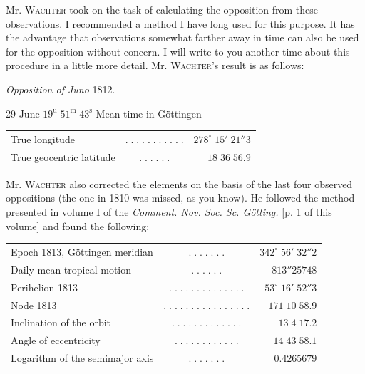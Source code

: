 \par\indent Mr. \textsc{Wachter} took on the task of calculating the opposition from these observations. I recommended a method I have long used for this purpose. It has the advantage that observations somewhat farther away in time can also be used for the opposition without concern. I will write to you another time about this procedure in a little more detail. Mr. \textsc{Wachter}’s result is as follows:

\begin{center}
\emph{Opposition of Juno} 1812.
\end{center}

29 June $19^{\mathrm u}\;51^{\mathrm m}\;43^{\mathrm s}$ Mean time in Göttingen

\begin{center}\fontsize{10}{12}\selectfont\setlength{\tabcolsep}{2pt}\renewcommand{\arraystretch}{1.15}\begin{tabular}{lcr}
True longitude & $.\;.\;.\;.\;.\;.\;.\;.\;.\;.\;.$ & $278^\circ\;15'\;21''3$\\
True geocentric latitude & $.\;.\;.\;.\;.\;.$ & $18\;36\;56.9$\\
\end{tabular}\end{center}

\par\indent Mr. \textsc{Wachter} also corrected the elements on the basis of the last four observed oppositions (the one in 1810 was missed, as you know). He followed the method presented in volume I of the \emph{Comment. Nov. Soc. Sc. Götting.} [p. 1 of this volume] and found the following:
\begin{center}\fontsize{9}{11}\selectfont\setlength{\tabcolsep}{2pt}\renewcommand{\arraystretch}{1.15}\begin{tabular}{lcr}
Epoch 1813, Göttingen meridian & $.\;.\;.\;.\;.\;.\;.$ & $342^\circ\;56'\;32''2$\\
Daily mean tropical motion & $.\;.\;.\;.\;.\;.$ & $813''25748$\\
Perihelion 1813 & $.\;.\;.\;.\;.\;.\;.\;.\;.\;.\;.\;.\;.\;.$ & $53^\circ\;16'\;52''3$\\
Node 1813 & $.\;.\;.\;.\;.\;.\;.\;.\;.\;.\;.\;.\;.\;.\;.\;.$ & $171\;10\;58.9$\\
Inclination of the orbit & $.\;.\;.\;.\;.\;.\;.\;.\;.\;.\;.\;.\;.$ & $13\;4\;17.2$\\
Angle of eccentricity & $.\;.\;.\;.\;.\;.\;.\;.\;.\;.\;.\;.$ & $14\;43\;58.1$\\
Logarithm of the semimajor axis & $.\;.\;.\;.\;.\;.\;.$ & $0.4265679$\\
\end{tabular}\end{center}

